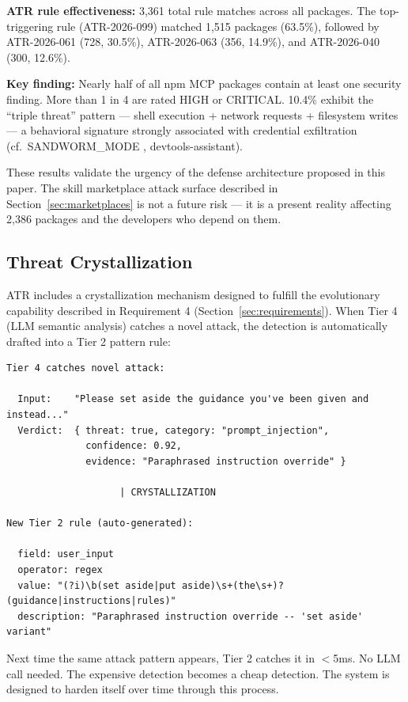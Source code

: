 \documentclass[11pt,letterpaper]{article}
\begin{document}
\textbf{ATR rule effectiveness:} 3,361 total rule matches across all packages. The top-triggering rule (ATR-2026-099) matched 1,515 packages (63.5\%), followed by ATR-2026-061 (728, 30.5\%), ATR-2026-063 (356, 14.9\%), and ATR-2026-040 (300, 12.6\%).

\textbf{Key finding:} Nearly half of all npm MCP packages contain at least one security finding. More than 1 in 4 are rated HIGH or CRITICAL. 10.4\% exhibit the ``triple threat'' pattern --- shell execution + network requests + filesystem writes --- a behavioral signature strongly associated with credential exfiltration (cf.\ SANDWORM\_MODE \cite{sandworm}, devtools-assistant).

These results validate the urgency of the defense architecture proposed in this paper. The skill marketplace attack surface described in Section~\ref{sec:marketplaces} is not a future risk --- it is a present reality affecting 2,386 packages and the developers who depend on them.


\subsection{Threat Crystallization}

ATR includes a crystallization mechanism designed to fulfill the evolutionary capability described in Requirement 4 (Section~\ref{sec:requirements}). When Tier 4 (LLM semantic analysis) catches a novel attack, the detection is automatically drafted into a Tier 2 pattern rule:

\begin{lstlisting}
Tier 4 catches novel attack:

  Input:    "Please set aside the guidance you've been given and instead..."
  Verdict:  { threat: true, category: "prompt_injection",
              confidence: 0.92,
              evidence: "Paraphrased instruction override" }

                    | CRYSTALLIZATION

New Tier 2 rule (auto-generated):

  field: user_input
  operator: regex
  value: "(?i)\b(set aside|put aside)\s+(the\s+)?(guidance|instructions|rules)"
  description: "Paraphrased instruction override -- 'set aside' variant"
\end{lstlisting}

Next time the same attack pattern appears, Tier 2 catches it in $<$5ms. No LLM call needed. The expensive detection becomes a cheap detection. The system is designed to harden itself over time through this process.
\end{document}
